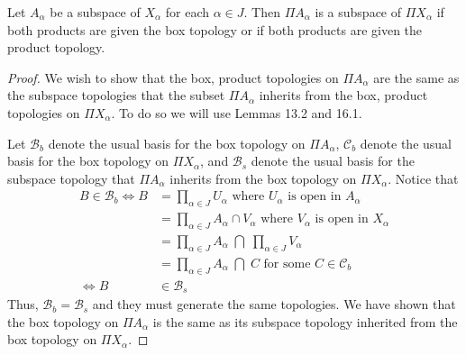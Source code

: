 \documentclass[11pt]{article}
\begin{document}



\begin{ex}{19.2}
  Let $A_\alpha$ be a subspace of $X_\alpha$ for each $\alpha \in J$. Then $\Pi
  A_\alpha$ is a subspace of $\Pi X_\alpha$ if both products are given the box
  topology or if both products are given the product topology.
\end{ex}

\begin{proof}
  We wish to show that the box, product topologies on $\Pi A_\alpha$ are the same as
  the subspace topologies that the subset $\Pi A_\alpha$ inherits from the box,
  product topologies on $\Pi X_\alpha$. To do so we will use Lemmas 13.2 and
  16.1.

  Let $\mathcal{B}_b$ denote the usual basis for the box topology on $\Pi
  A_\alpha$, $\mathcal{C}_b$ denote the usual basis for the box topology on
  $\Pi X_\alpha$, and $\mathcal{B}_s$ denote the usual basis for the subspace
  topology that $\Pi A_\alpha$ inherits from the box topology on $\Pi X_\alpha$.
  Notice that
  \begin{align*}
    B \in \mathcal{B}_b
      \iff B &= \prod_{\alpha \in J} U_\alpha \text{ where
                $U_\alpha$ is open in $A_\alpha$} \\
             &= \prod_{\alpha \in J} A_\alpha \cap V_\alpha \text{ where
                $V_\alpha$ is open in $X_\alpha$} \\
             &= \prod_{\alpha \in J} A_\alpha \;\bigcap \;\prod_{\alpha
                \in J} V_\alpha \\
             &= \prod_{\alpha \in J} A_\alpha \; \bigcap \;C \text{ for some $C \in
                \mathcal{C}_b$} \\
        \iff B &\in \mathcal{B}_s
  \end{align*}
  Thus, $\mathcal{B}_b = \mathcal{B}_s$ and they must generate the same
  topologies. We have shown that the box topology on $\Pi A_\alpha$
  is the same as its subspace topology inherited from the box topology on $\Pi
  X_\alpha$.


\end{proof}
\end{document}
